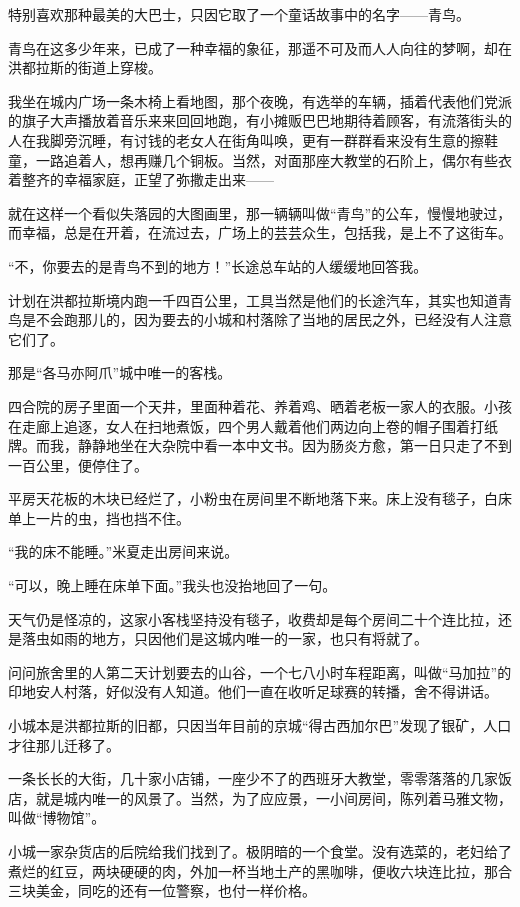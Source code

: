 \par 特别喜欢那种最美的大巴士，只因它取了一个童话故事中的名字——青鸟。
\par 青鸟在这多少年来，已成了一种幸福的象征，那遥不可及而人人向往的梦啊，却在洪都拉斯的街道上穿梭。
\par 我坐在城内广场一条木椅上看地图，那个夜晚，有选举的车辆，插着代表他们党派的旗子大声播放着音乐来来回回地跑，有小摊贩巴巴地期待着顾客，有流落街头的人在我脚旁沉睡，有讨钱的老女人在街角叫唤，更有一群群看来没有生意的擦鞋童，一路追着人，想再赚几个铜板。当然，对面那座大教堂的石阶上，偶尔有些衣着整齐的幸福家庭，正望了弥撒走出来——
\par 就在这样一个看似失落园的大图画里，那一辆辆叫做“青鸟”的公车，慢慢地驶过，而幸福，总是在开着，在流过去，广场上的芸芸众生，包括我，是上不了这街车。
\par “不，你要去的是青鸟不到的地方！”长途总车站的人缓缓地回答我。
\par 计划在洪都拉斯境内跑一千四百公里，工具当然是他们的长途汽车，其实也知道青鸟是不会跑那儿的，因为要去的小城和村落除了当地的居民之外，已经没有人注意它们了。
\par 那是“各马亦阿爪”城中唯一的客栈。
\par 四合院的房子里面一个天井，里面种着花、养着鸡、晒着老板一家人的衣服。小孩在走廊上追逐，女人在扫地煮饭，四个男人戴着他们两边向上卷的帽子围着打纸牌。而我，静静地坐在大杂院中看一本中文书。因为肠炎方愈，第一日只走了不到一百公里，便停住了。
\par 平房天花板的木块已经烂了，小粉虫在房间里不断地落下来。床上没有毯子，白床单上一片的虫，挡也挡不住。
\par “我的床不能睡。”米夏走出房间来说。
\par “可以，晚上睡在床单下面。”我头也没抬地回了一句。
\par 天气仍是怪凉的，这家小客栈坚持没有毯子，收费却是每个房间二十个连比拉，还是落虫如雨的地方，只因他们是这城内唯一的一家，也只有将就了。
\par 问问旅舍里的人第二天计划要去的山谷，一个七八小时车程距离，叫做“马加拉”的印地安人村落，好似没有人知道。他们一直在收听足球赛的转播，舍不得讲话。
\par 小城本是洪都拉斯的旧都，只因当年目前的京城“得古西加尔巴”发现了银矿，人口才往那儿迁移了。
\par 一条长长的大街，几十家小店铺，一座少不了的西班牙大教堂，零零落落的几家饭店，就是城内唯一的风景了。当然，为了应应景，一小间房间，陈列着马雅文物，叫做“博物馆”。
\par 小城一家杂货店的后院给我们找到了。极阴暗的一个食堂。没有选菜的，老妇给了煮烂的红豆，两块硬硬的肉，外加一杯当地土产的黑咖啡，便收六块连比拉，那合三块美金，同吃的还有一位警察，也付一样价格。
